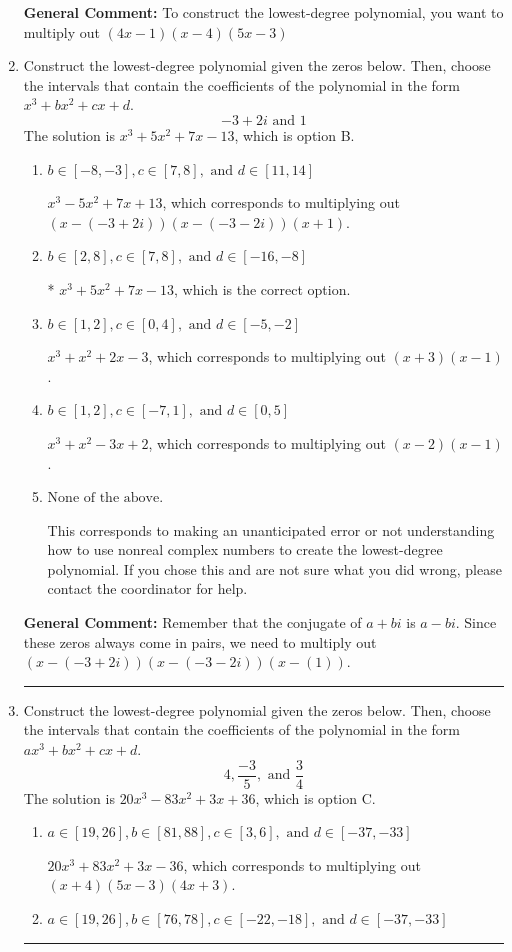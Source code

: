 \documentclass{extbook}[14pt]
\newcommand{\litem}[1]{\item #1

\rule{\textwidth}{0.4pt}}
\begin{document}
\begin{enumerate}
{\textbf{General Comment:} To construct the lowest-degree polynomial, you want to multiply out $(4x -1)(x -4)(5x -3)$
}
\litem{
Construct the lowest-degree polynomial given the zeros below. Then, choose the intervals that contain the coefficients of the polynomial in the form $x^3+bx^2+cx+d$.
\[ -3 + 2 i \text{ and } 1 \]The solution is \( x^{3} +5 x^{2} +7 x -13 \), which is option B.\begin{enumerate}[label=\Alph*.]
\item \( b \in [-8, -3], c \in [7, 8], \text{ and } d \in [11, 14] \)

$x^{3} -5 x^{2} +7 x + 13$, which corresponds to multiplying out $(x-(-3 + 2 i))(x-(-3 - 2 i))(x + 1)$.
\item \( b \in [2, 8], c \in [7, 8], \text{ and } d \in [-16, -8] \)

* $x^{3} +5 x^{2} +7 x -13$, which is the correct option.
\item \( b \in [1, 2], c \in [0, 4], \text{ and } d \in [-5, -2] \)

$x^{3} + x^{2} +2 x -3$, which corresponds to multiplying out $(x + 3)(x -1)$.
\item \( b \in [1, 2], c \in [-7, 1], \text{ and } d \in [0, 5] \)

$x^{3} + x^{2} -3 x + 2$, which corresponds to multiplying out $(x -2)(x -1)$.
\item \( \text{None of the above.} \)

This corresponds to making an unanticipated error or not understanding how to use nonreal complex numbers to create the lowest-degree polynomial. If you chose this and are not sure what you did wrong, please contact the coordinator for help.
\end{enumerate}

\textbf{General Comment:} Remember that the conjugate of $a+bi$ is $a-bi$. Since these zeros always come in pairs, we need to multiply out $(x-(-3 + 2 i))(x-(-3 - 2 i))(x-(1))$.
}
\litem{
Construct the lowest-degree polynomial given the zeros below. Then, choose the intervals that contain the coefficients of the polynomial in the form $ax^3+bx^2+cx+d$.
\[ 4, \frac{-3}{5}, \text{ and } \frac{3}{4} \]The solution is \( 20x^{3} -83 x^{2} +3 x + 36 \), which is option C.\begin{enumerate}[label=\Alph*.]
\item \( a \in [19, 26], b \in [81, 88], c \in [3, 6], \text{ and } d \in [-37, -33] \)

$20x^{3} +83 x^{2} +3 x -36$, which corresponds to multiplying out $(x + 4)(5x -3)(4x + 3)$.
\item \( a \in [19, 26], b \in [76, 78], c \in [-22, -18], \text{ and } d \in [-37, -33] \)


\end{enumerate}}
\end{enumerate}
\end{document}
